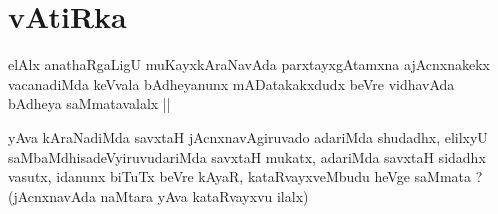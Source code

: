 \section*{vAtiRka}

\begin{artha}
elAlx anathaRgaLigU muKayxkAraNavAda parxtayxgAtamxna ajAcnxnakekx
vacanadiMda keVvala bAdheyanunx mADatakakxdudx beVre vidhavAda bAdheya
saMmatavalalx ||
\end{artha}

\begin{artha}
yAva kAraNadiMda savxtaH jAcnxnavAgiruvado adariMda shudadhx, elilxyU
saMbaMdhisadeVyiruvudariMda savxtaH mukatx, adariMda savxtaH sidadhx
vasutx, idanunx biTuTx beVre kAyaR, kataRvayxveMbudu heVge saMmata ?
(jAcnxnavAda naMtara yAva kataRvayxvu ilalx)
\end{artha}


